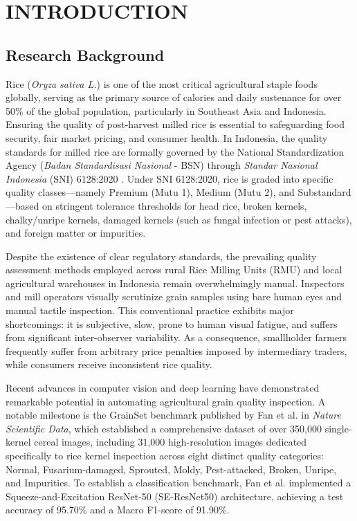\chapter{INTRODUCTION}
	\section{Research Background}
	\setlength{\leftskip}{0.7cm}
	
	Rice (\textit{Oryza sativa L.}) is one of the most critical agricultural staple foods globally, serving as the primary source of calories and daily sustenance for over 50\% of the global population, particularly in Southeast Asia and Indonesia. Ensuring the quality of post-harvest milled rice is essential to safeguarding food security, fair market pricing, and consumer health. In Indonesia, the quality standards for milled rice are formally governed by the National Standardization Agency (\textit{Badan Standardisasi Nasional} - BSN) through \textit{Standar Nasional Indonesia} (SNI) 6128:2020 \cite{bsn2020sni}. Under SNI 6128:2020, rice is graded into specific quality classes—namely Premium (Mutu 1), Medium (Mutu 2), and Substandard—based on stringent tolerance thresholds for head rice, broken kernels, chalky/unripe kernels, damaged kernels (such as fungal infection or pest attacks), and foreign matter or impurities.
	
	Despite the existence of clear regulatory standards, the prevailing quality assessment methods employed across rural Rice Milling Units (RMU) and local agricultural warehouses in Indonesia remain overwhelmingly manual. Inspectors and mill operators visually scrutinize grain samples using bare human eyes and manual tactile inspection. This conventional practice exhibits major shortcomings: it is subjective, slow, prone to human visual fatigue, and suffers from significant inter-observer variability. As a consequence, smallholder farmers frequently suffer from arbitrary price penalties imposed by intermediary traders, while consumers receive inconsistent rice quality.
	
	Recent advances in computer vision and deep learning have demonstrated remarkable potential in automating agricultural grain quality inspection. A notable milestone is the GrainSet benchmark published by Fan et al. \cite{fan2023grainset} in \textit{Nature Scientific Data}, which established a comprehensive dataset of over 350,000 single-kernel cereal images, including 31,000 high-resolution images dedicated specifically to rice kernel inspection across eight distinct quality categories: Normal, Fusarium-damaged, Sprouted, Moldy, Pest-attacked, Broken, Unripe, and Impurities. To establish a classification benchmark, Fan et al. implemented a Squeeze-and-Excitation ResNet-50 (SE-ResNet50) architecture, achieving a test accuracy of 95.70\% and a Macro F1-score of 91.90\%.
	
